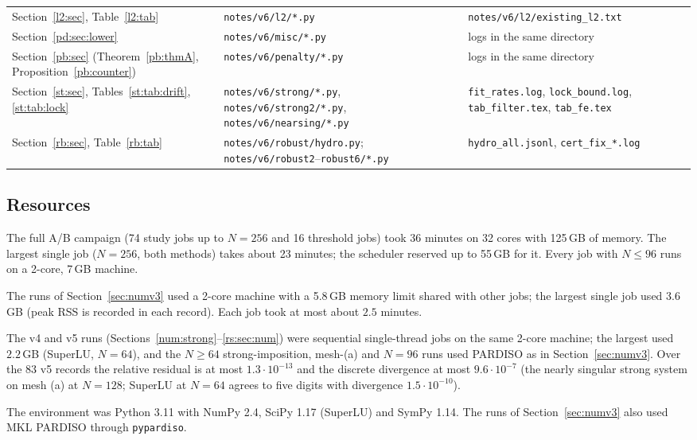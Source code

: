 {\begin{longtable}{>{\raggedright\arraybackslash}p{}>{\raggedright\arraybackslash}p{}>{\raggedright\arraybackslash}p{}}
Section~\ref{l2:sec}, Table~\ref{l2:tab} & \texttt{notes/v6/l2/*.py} & \texttt{notes/v6/l2/existing\_l2.txt}\\
Section~\ref{pd:sec:lower} & \texttt{notes/v6/misc/*.py} & logs in the same directory\\
Section~\ref{pb:sec} (Theorem~\ref{pb:thmA}, Proposition~\ref{pb:counter}) & \texttt{notes/v6/penalty/*.py} & logs in the same directory\\
Section~\ref{st:sec}, Tables~\ref{st:tab:drift}, \ref{st:tab:lock} & \texttt{notes/v6/strong/*.py}, \texttt{notes/v6/strong2/*.py}, \texttt{notes/v6/nearsing/*.py} & \texttt{fit\_rates.log}, \texttt{lock\_bound.log}, \texttt{tab\_filter.tex}, \texttt{tab\_fe.tex}\\
Section~\ref{rb:sec}, Table~\ref{rb:tab} & \texttt{notes/v6/robust/hydro.py}; \texttt{notes/v6/robust2}--\texttt{robust6/*.py} & \texttt{hydro\_all.jsonl}, \texttt{cert\_fix\_*.log}\\
\bottomrule
\end{longtable}
}

\subsection*{Resources}
The full A/B campaign (74 study jobs up to $N=256$ and 16 threshold jobs) took 36 minutes on 32 cores with 125\,GB of memory. The largest single job ($N=256$, both methods) takes about 23 minutes; the scheduler reserved up to 55\,GB for it. Every job with $N\le96$ runs on a 2-core, 7\,GB machine.

The runs of Section~\ref{sec:numv3} used a 2-core machine with a 5.8\,GB memory limit shared with other jobs; the largest single job used 3.6\,GB (peak RSS is recorded in each record). Each job took at most about $2.5$ minutes.

The v4 and v5 runs (Sections~\ref{num:strong}--\ref{rs:sec:num}) were sequential single-thread jobs on the same 2-core machine; the largest used $2.2$\,GB (SuperLU, $N=64$), and the $N\ge64$ strong-imposition, mesh-(a) and $N=96$ runs used PARDISO as in Section~\ref{sec:numv3}. Over the $83$ v5 records the relative residual is at most $1.3\cdot10^{-13}$ and the discrete divergence at most $9.6\cdot10^{-7}$ (the nearly singular strong system on mesh (a) at $N=128$; SuperLU at $N=64$ agrees to five digits with divergence $1.5\cdot10^{-10}$).

The environment was Python 3.11 with NumPy 2.4, SciPy 1.17 (SuperLU) and SymPy 1.14. The runs of Section~\ref{sec:numv3} also used MKL PARDISO through \texttt{pypardiso}.
